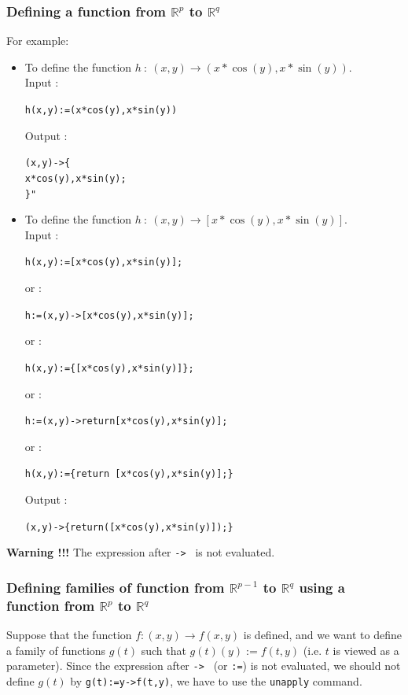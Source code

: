 \documentclass[a4paper,11pt]{book}
\begin{document}
\subsubsection{Defining a function from  $\mathbb{R}^p$ to $\mathbb{R}^q$}
For example:
\begin{itemize}
\item  To define the function $h\ :\ (x,y)\rightarrow (x*\cos(y),x*\sin(y))$.\\
 Input :
\begin{center}{\tt h(x,y):=(x*cos(y),x*sin(y))}\end{center}
Output :
\begin{center}{\tt (x,y)->\{ \\
  x*cos(y),x*sin(y);\\  
\}"}\end{center}
\item  To define the function $h\ :\ (x,y)\rightarrow [x*\cos(y),x*\sin(y)]$.\\
 Input :
\begin{center}{\tt h(x,y):=[x*cos(y),x*sin(y)];}\end{center}
or :
\begin{center}{\tt h:=(x,y)->[x*cos(y),x*sin(y)];}\end{center}
or :
\begin{center}{\tt h(x,y):=\{[x*cos(y),x*sin(y)]\};}\end{center}
or : 
\begin{center}{\tt h:=(x,y)->return[x*cos(y),x*sin(y)];}\end{center}
or : 
\begin{center}{\tt h(x,y):=\{return [x*cos(y),x*sin(y)];\}}\end{center}
Output :
\begin{center}{\tt   (x,y)->\{return([x*cos(y),x*sin(y)]);\}}\end{center}
\end{itemize}
{\bf Warning !!!} The expression after {\tt  -> } is not evaluated.

\subsubsection{Defining families of function from $\mathbb{R}^{p-1}$ 
to $\mathbb{R}^q$ using a function from $\mathbb{R}^p$ to $\mathbb{R}^q$}
Suppose that the function $f: (x,y) \rightarrow  f(x,y)$ is defined, 
and we want to define a family of functions $g(t)$ such
that $g(t)(y):=f(t,y)$ (i.e. $t$ is viewed as a parameter).
Since the expression after {\tt -> } (or {\tt :=})
is not evaluated, we should not define $g(t)$ by {\tt g(t):=y->f(t,y)},
we have to use the {\tt unapply} command.
\end{document}
